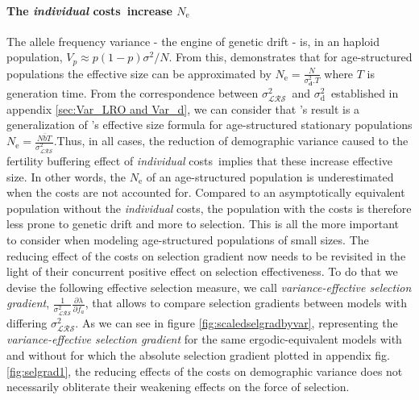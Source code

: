 \documentclass[10pt,a4paper]{article}
\newcommand{\PCoR}{\emph{individual} costs}
\newcommand{\vLRO}{$\sigma_{\mathrm{\mathcal{LRS}}}^2$}
\newcommand{\vd}{$\sigma_{\mathrm{d}}^2$}
\begin{document}
\paragraph{The \PCoR\ increase $N_{\mathrm{e}}$}
The allele frequency variance - the engine of genetic drift - is, in an haploid population, $V_{p} \approx p(1-p)\sigma^{2}/N$. From this, \citet{Engen2005} demonstrates that for age-structured populations the effective size can be approximated by $N_{\mathrm{e}} = \frac{N}{\sigma_{\mathbf{d}}^{2}.T}$ where $T$ is generation time. From the correspondence between \vLRO\ and \vd\ established in appendix \ref{sec:Var_LRO and Var_d}, we can consider that \citet{Engen2005}'s result is a generalization of \citet{Hill1972}'s effective size formula for age-structured stationary populations $N_{\mathrm{e}} = \frac{N \bar{b}T}{\sigma_{\mathcal{LRS}}^{2}}$.Thus, in all cases, the reduction of demographic variance caused to the fertility buffering effect of \PCoR\ implies that these increase effective size. In other words, the $N_{\mathrm{e}}$ of an age-structured population is underestimated when the costs are not accounted for.  Compared to an asymptotically equivalent population without the \PCoR , the population with the costs is therefore less prone to genetic drift and more to selection. This is all the more important to consider when modeling age-structured populations of small sizes. 
The reducing effect of the costs on selection gradient \citep[see][]{Coste2017} now needs to be revisited in the light of their concurrent positive effect on selection effectiveness. To do that we devise the following effective selection measure, we call \emph{variance-effective selection gradient}, $\frac{1}{\sigma^{2}_{\mathcal{LRS}}}\frac{\partial \lambda}{\partial f_{a}}$, that allows to compare selection gradients between models with differing \vLRO.  As we can see in figure \ref{fig:scaledselgradbyvar}, representing the \emph{variance-effective selection gradient} for the same ergodic-equivalent models with and without for which the absolute selection gradient plotted in appendix fig. \ref{fig:selgrad1}, the reducing  effects of the costs on demographic variance does not necessarily obliterate their weakening effects on the force of selection.\\
\end{document}
